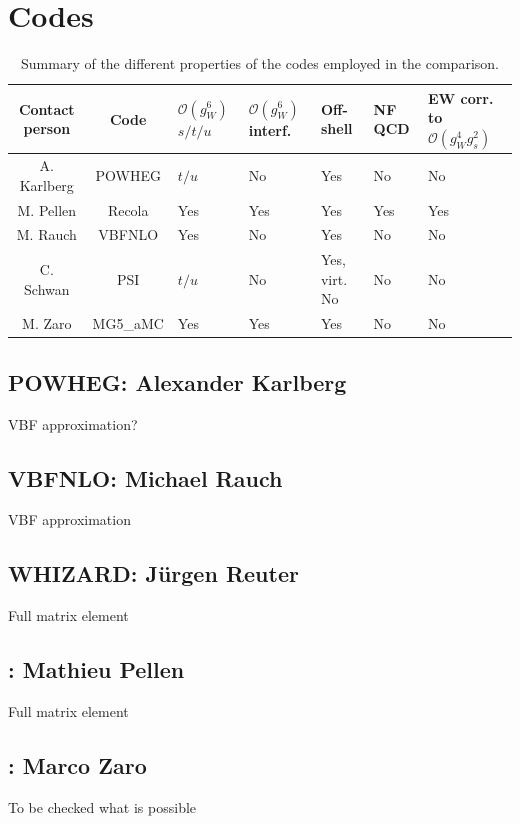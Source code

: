 \documentclass[a4paper,10pt]{report}
\begin{document}
\section{Codes}
\begin{table}
    \footnotesize
    \begin{tabularx}{\textwidth}{c|c|X|X|X|X|X}
        Contact person  &  Code  &  $\mathcal O(g_W^6)$ $s/t/u$  &  $\mathcal O(g_W^6)$ interf.  &  Off-shell  &  NF QCD  &  EW corr. to $\mathcal O(g_W^4g_s^2)$  \\
        \hline
        \hline
        A. Karlberg  &  {\sc POWHEG}  &  $t/u$  &  No  &  Yes  &  No  &  No  \\
        M. Pellen    &  {\sc Recola}  &  Yes  &  Yes  &  Yes  &  Yes  &  Yes  \\
        M. Rauch     &  {\sc VBFNLO}  &  Yes  &  No  &  Yes  &  No  &  No  \\
        C. Schwan    &  {\sc PSI}     &  $t/u$  &  No  &  Yes, virt. No  &  No  &  No  \\
        M. Zaro      &  {\sc MG5\_aMC}  &  Yes  &  Yes  &  Yes  &  No  &  No
    \end{tabularx}
    \caption{\label{tab:codes} Summary of the different properties of the codes employed in the comparison.}
\end{table}

\subsection{ {\sc POWHEG}: Alexander Karlberg}
VBF approximation? \\
\subsection{ {\sc VBFNLO}: Michael Rauch}
VBF approximation \\
\subsection{ {\sc WHIZARD}: J\"urgen Reuter}
Full matrix element \\
\subsection{ \recola: Mathieu Pellen}
Full matrix element \\
\subsection{ \madgraph: Marco Zaro}
To be checked what is possible \\
\end{document}
